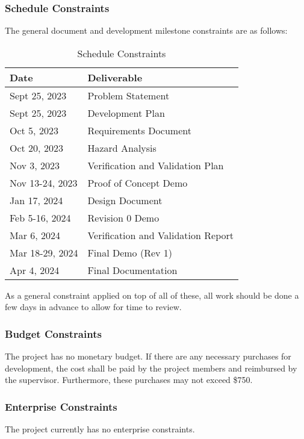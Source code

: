 \documentclass[12pt]{article}
\begin{document}
\subsubsection{Schedule Constraints}
The general document and development milestone constraints are as follows:
\begin{table}[H]
	\centering
	\caption{Schedule Constraints}
	\vspace{5pt}
	\begin{tabular}{|p{}|p{}|}
		\hline
		\textbf{Date}   & \textbf{Deliverable}               \\
		\hline
		Sept 25, 2023    & Problem Statement \\
        \hline
		Sept 25, 2023    & Development Plan \\
        \hline
		Oct 5, 2023    & Requirements Document \\
        \hline
		Oct 20, 2023    & Hazard Analysis \\
		\hline
		Nov 3, 2023     & Verification and Validation Plan   \\
		\hline
		Nov 13-24, 2023 & Proof of Concept Demo              \\
		\hline
		Jan 17, 2024    & Design Document                    \\
		\hline
		Feb 5-16, 2024  & Revision 0 Demo                    \\
		\hline
		Mar 6, 2024     & Verification and Validation Report \\
		\hline
		Mar 18-29, 2024 & Final Demo (Rev 1)                 \\
		\hline
		Apr 4, 2024     & Final Documentation                \\
		\hline
	\end{tabular}
\end{table}

\noindent
As a general constraint applied on top of all of these, all work should be done a few days in advance to allow for time to review. 

\subsubsection{Budget Constraints}
The project has no monetary budget. If there are any necessary purchases for development, the cost
shall be paid by the project members and reimbursed by the supervisor. Furthermore, these purchases
may not exceed \$750.

\subsubsection{Enterprise Constraints}
The project currently has no enterprise constraints. 
\end{document}
